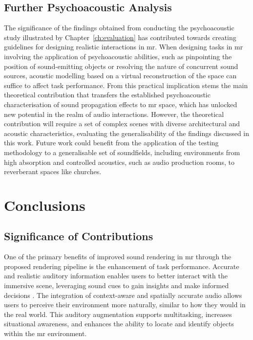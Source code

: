 \subsection{Further Psychoacoustic Analysis}
The significance of the findings obtained from conducting the psychoacoustic study illustrated by Chapter~\ref{ch:evaluation} has contributed towards creating guidelines for designing realistic interactions in \acrshort{mr}. When designing tasks in \acrshort{mr} involving the application of psychoacoustic abilities, such as pinpointing the position of sound-emitting objects or resolving the nature of concurrent sound sources, acoustic modelling based on a virtual reconstruction of the space can suffice to affect task performance. From this practical implication stems the main theoretical contribution that transfers the established psychoacoustic characterisation of sound propagation effects to \acrshort{mr} space, which has unlocked new potential in the realm of audio interactions. However, the theoretical contribution will require a set of complex scenes with diverse architectural and acoustic characteristics, evaluating the generalisability of the findings discussed in this work. Future work could benefit from the application of the testing methodology to a generalisable set of soundfields, including environments from high absorption and controlled acoustics, such as audio production rooms, to reverberant spaces like churches.\par

\section{Conclusions}
\subsection{Significance of Contributions}
One of the primary benefits of improved sound rendering in \acrshort{mr} through the proposed rendering pipeline is the enhancement of task performance. Accurate and realistic auditory information enables users to better interact with the immersive scene, leveraging sound cues to gain insights and make informed decisions \citep{rubio2017immersive,zimmons2003influence}. The integration of context-aware and spatially accurate audio allows users to perceive their environment more naturally, similar to how they would in the real world. This auditory augmentation supports multitasking, increases situational awareness, and enhances the ability to locate and identify objects within the \acrshort{mr} environment. 


